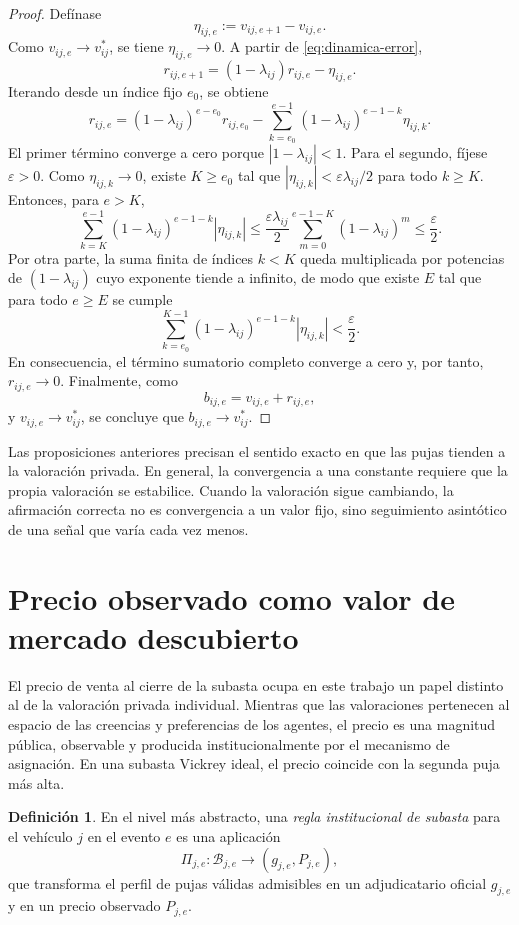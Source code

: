 \documentclass[11pt,a4paper]{article}
\theoremstyle{definition}
\newtheorem{definicion}{Definición}
\begin{document}
\begin{proof}
Defínase
\[
\eta_{ij,e}:=v_{ij,e+1}-v_{ij,e}.
\]
Como $v_{ij,e}\to v_{ij}^\ast$, se tiene $\eta_{ij,e}\to 0$. A partir de \eqref{eq:dinamica-error},
\[
r_{ij,e+1}=(1-\lambda_{ij})r_{ij,e}-\eta_{ij,e}.
\]
Iterando desde un índice fijo $e_0$, se obtiene
\[
r_{ij,e}=(1-\lambda_{ij})^{e-e_0}r_{ij,e_0}-\sum_{k=e_0}^{e-1}(1-\lambda_{ij})^{e-1-k}\eta_{ij,k}.
\]
El primer término converge a cero porque $|1-\lambda_{ij}|<1$. Para el segundo, fíjese $\varepsilon>0$. Como $\eta_{ij,k}\to 0$, existe $K\geq e_0$ tal que $|\eta_{ij,k}|<\varepsilon\lambda_{ij}/2$ para todo $k\geq K$. Entonces, para $e>K$,
\[
\sum_{k=K}^{e-1}(1-\lambda_{ij})^{e-1-k}|\eta_{ij,k}|
\leq \frac{\varepsilon\lambda_{ij}}{2}\sum_{m=0}^{e-1-K}(1-\lambda_{ij})^m
\leq \frac{\varepsilon}{2}.
\]
Por otra parte, la suma finita de índices $k< K$ queda multiplicada por potencias de $(1-\lambda_{ij})$ cuyo exponente tiende a infinito, de modo que existe $E$ tal que para todo $e\geq E$ se cumple
\[
\sum_{k=e_0}^{K-1}(1-\lambda_{ij})^{e-1-k}|\eta_{ij,k}|<\frac{\varepsilon}{2}.
\]
En consecuencia, el término sumatorio completo converge a cero y, por tanto, $r_{ij,e}\to 0$. Finalmente, como
\[
b_{ij,e}=v_{ij,e}+r_{ij,e},
\]
y $v_{ij,e}\to v_{ij}^\ast$, se concluye que $b_{ij,e}\to v_{ij}^\ast$.
\end{proof}

Las proposiciones anteriores precisan el sentido exacto en que las pujas tienden a la valoración privada. En general, la convergencia a una constante requiere que la propia valoración se estabilice. Cuando la valoración sigue cambiando, la afirmación correcta no es convergencia a un valor fijo, sino seguimiento asintótico de una señal que varía cada vez menos.

\section{Precio observado como valor de mercado descubierto}

El precio de venta al cierre de la subasta ocupa en este trabajo un papel distinto al de la valoración privada individual. Mientras que las valoraciones pertenecen al espacio de las creencias y preferencias de los agentes, el precio es una magnitud pública, observable y producida institucionalmente por el mecanismo de asignación. En una subasta Vickrey ideal, el precio coincide con la segunda puja más alta.

\begin{definicion}
En el nivel más abstracto, una \emph{regla institucional de subasta} para el vehículo $j$ en el evento $e$ es una aplicación
\[
\Pi_{j,e}:\mathcal{B}_{j,e}\longrightarrow (g_{j,e},P_{j,e}),
\]
que transforma el perfil de pujas válidas admisibles en un adjudicatario oficial $g_{j,e}$ y en un precio observado $P_{j,e}$.
\end{definicion}
\end{document}
